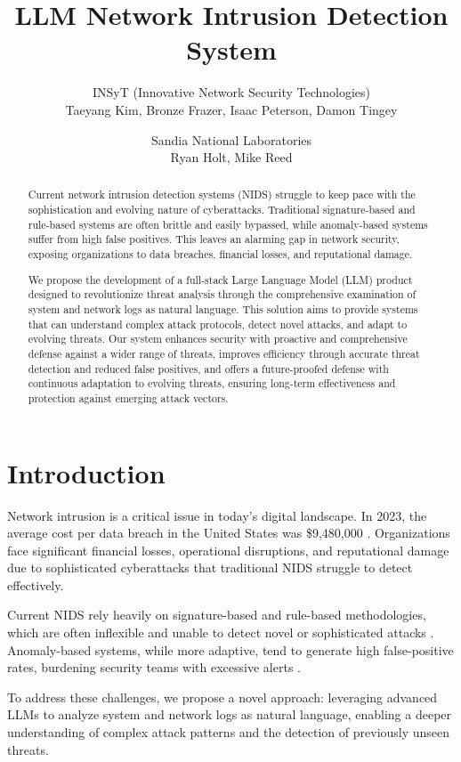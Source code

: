 \documentclass[12pt]{article}
\title{LLM Network Intrusion Detection System}
\author{
    INSyT (Innovative Network Security Technologies)\\
    Taeyang Kim, Bronze Frazer, Isaac Peterson, Damon Tingey\\
    \and
    Sandia National Laboratories\\
    Ryan Holt, Mike Reed\\
}
\date{}
\begin{document}
\maketitle

\begin{abstract}
Current network intrusion detection systems (NIDS) struggle to keep pace with the sophistication and evolving nature of cyberattacks. Traditional signature-based and rule-based systems are often brittle and easily bypassed, while anomaly-based systems suffer from high false positives. This leaves an alarming gap in network security, exposing organizations to data breaches, financial losses, and reputational damage.

We propose the development of a full-stack Large Language Model (LLM) product designed to revolutionize threat analysis through the comprehensive examination of system and network logs as natural language. This solution aims to provide systems that can understand complex attack protocols, detect novel attacks, and adapt to evolving threats. Our system enhances security with proactive and comprehensive defense against a wider range of threats, improves efficiency through accurate threat detection and reduced false positives, and offers a future-proofed defense with continuous adaptation to evolving threats, ensuring long-term effectiveness and protection against emerging attack vectors.
\end{abstract}

\section{Introduction}

Network intrusion is a critical issue in today's digital landscape. In 2023, the average cost per data breach in the United States was \$9,480,000 \cite{databreachreport}. Organizations face significant financial losses, operational disruptions, and reputational damage due to sophisticated cyberattacks that traditional NIDS struggle to detect effectively.

Current NIDS rely heavily on signature-based and rule-based methodologies, which are often inflexible and unable to detect novel or sophisticated attacks \cite{traditionalnids}. Anomaly-based systems, while more adaptive, tend to generate high false-positive rates, burdening security teams with excessive alerts \cite{anomalyissues}.

To address these challenges, we propose a novel approach: leveraging advanced LLMs to analyze system and network logs as natural language, enabling a deeper understanding of complex attack patterns and the detection of previously unseen threats.
\end{document}
